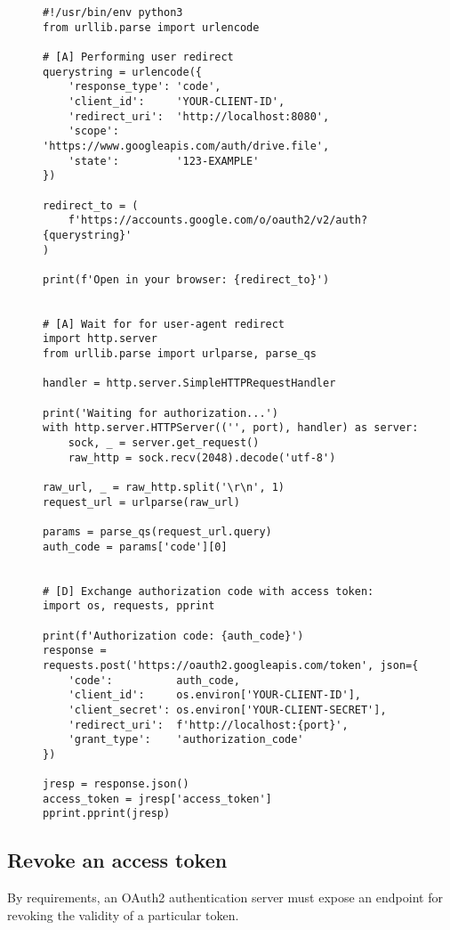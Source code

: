 \begin{figure}[h!]
    \begin{lstlisting}[label={lst:authorization-code}, caption={Obtain the access token with grant type authorization code}]
#!/usr/bin/env python3
from urllib.parse import urlencode

# [A] Performing user redirect
querystring = urlencode({
    'response_type': 'code',
    'client_id':     'YOUR-CLIENT-ID',
    'redirect_uri':  'http://localhost:8080',
    'scope':         'https://www.googleapis.com/auth/drive.file',
    'state':         '123-EXAMPLE'
})

redirect_to = (
    f'https://accounts.google.com/o/oauth2/v2/auth?{querystring}'
)

print(f'Open in your browser: {redirect_to}')


# [A] Wait for for user-agent redirect
import http.server
from urllib.parse import urlparse, parse_qs

handler = http.server.SimpleHTTPRequestHandler

print('Waiting for authorization...')
with http.server.HTTPServer(('', port), handler) as server:
    sock, _ = server.get_request()
    raw_http = sock.recv(2048).decode('utf-8')

raw_url, _ = raw_http.split('\r\n', 1)
request_url = urlparse(raw_url)

params = parse_qs(request_url.query)
auth_code = params['code'][0]


# [D] Exchange authorization code with access token:
import os, requests, pprint

print(f'Authorization code: {auth_code}')
response = requests.post('https://oauth2.googleapis.com/token', json={
    'code':          auth_code,
    'client_id':     os.environ['YOUR-CLIENT-ID'],
    'client_secret': os.environ['YOUR-CLIENT-SECRET'],
    'redirect_uri':  f'http://localhost:{port}',
    'grant_type':    'authorization_code'
})

jresp = response.json()
access_token = jresp['access_token']
pprint.pprint(jresp)

\end{lstlisting}
\end{figure}

\subsection{Revoke an access token}
By requirements, an OAuth2 authentication server must expose an endpoint for
revoking the validity of a particular token.
